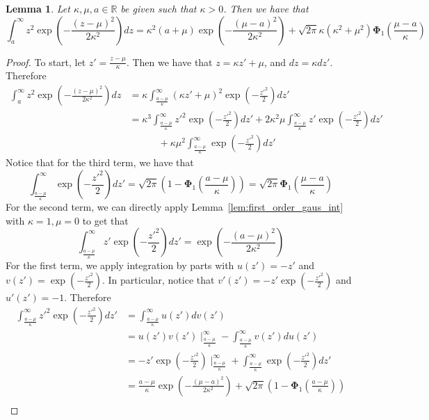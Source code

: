 \documentclass[10pt]{article} %
\newtheorem{lemma}[theorem]{Lemma}
\theoremstyle{definition}
\theoremstyle{plain}
\newcommand{\paren}[1]{\left(#1\right)}
\providecommand{\R}{\mathbb{R}}
\begin{document}
\begin{lemma}
    \label{lem:second_order_gaus_int}
    Let $\kappa, \mu, a\in\R$ be given such that $\kappa > 0$. Then we have that
    \[
        \int_a^\infty z^2\exp\paren{-\frac{\paren{z-\mu}^2}{2\kappa^2}}dz = \kappa^2\paren{a+\mu}\exp\paren{-\frac{\paren{\mu-a}^2}{2\kappa^2}} + \sqrt{2\pi}\kappa\paren{\kappa^2+\mu^2}\bm{\Phi}_1\paren{\frac{\mu-a}{\kappa}}
    \]
\end{lemma}
\begin{proof}
    To start, let $z' = \frac{z - \mu}{\kappa}$. Then we have that $z = \kappa z' + \mu$, and $dz = \kappa dz'$. Therefore
    \begin{align*}
        \int_{a}^\infty z^2\exp\paren{-\frac{\paren{z-\mu}^2}{2\kappa^2}}dz & = \kappa\int_{\frac{a-\mu}{\kappa}}^\infty\paren{\kappa z' + \mu}^2\exp\paren{-\frac{z'^2}{2}}dz'\\
        & = \kappa^3\int_{\frac{a-\mu}{\kappa}}^\infty z'^2\exp\paren{-\frac{z'^2}{2}}dz' + 2\kappa^2\mu\int_{\frac{a-\mu}{\kappa}}^\infty z'\exp\paren{-\frac{z'^2}{2}}dz'\\
        & \quad\quad\quad + \kappa\mu^2\int_{\frac{a-\mu}{\kappa}}^\infty\exp\paren{-\frac{z'^2}{2}}dz'
    \end{align*}
    Notice that for the third term, we have that
    \[
        \int_{\frac{a-\mu}{\kappa}}^\infty\exp\paren{-\frac{z'^2}{2}}dz' = \sqrt{2\pi}\paren{1 - \bm{\Phi}_1\paren{\frac{a - \mu}{\kappa}}} = \sqrt{2\pi}\bm{\Phi}_1\paren{\frac{\mu-a}{\kappa}}
    \]
    For the second term, we can directly apply Lemma~\ref{lem:first_order_gaus_int} with $\kappa = 1, \mu = 0$ to get that
    \[
        \int_{\frac{a-\mu}{\kappa}}^\infty z'\exp\paren{-\frac{z'^2}{2}}dz' = \exp\paren{-\frac{\paren{a-\mu}^2}{2\kappa^2}}
    \]
    For the first term, we apply integration by parts with $u(z') = -z'$ and $v(z') = \exp\paren{-\frac{z'^2}{2}}$. In particular, notice that $v'(z') = -z'\exp\paren{-\frac{z'^2}{2}}$ and $u'(z') = -1$. Therefore
    \begin{align*}
        \int_{\frac{a-\mu}{\kappa}}^\infty z'^2\exp\paren{-\frac{z'^2}{2}}dz' & = \int_{\frac{a-\mu}{\kappa}}^\infty  u(z')dv(z')\\
        & = u(z')v(z')\mid_{\frac{a-\mu}{\kappa}}^\infty  - \int_{\frac{a-\mu}{\kappa}}^\infty  v(z')du(z')\\
        & = -z'\exp\paren{-\frac{z'^2}{2}}\mid_{\frac{a-\mu}{\kappa}}^\infty  + \int_{\frac{a-\mu}{\kappa}}^\infty  \exp\paren{-\frac{z'^2}{2}}dz'\\
        & = \frac{a - \mu}{\kappa}\exp\paren{-\frac{\paren{\mu-a}^2}{2\kappa^2}} + \sqrt{2\pi}\paren{1-\bm{\Phi}_1\paren{\frac{a-\mu}{\kappa}}}\\

\end{align*}
\end{proof}
\end{document}
